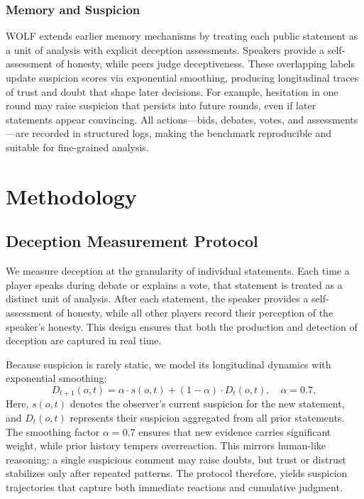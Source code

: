 \documentclass{article}
\begin{document}
\subsubsection*{Memory and Suspicion}
WOLF extends earlier memory mechanisms \cite{bailis2024werewolfarenacasestudy} by treating each public statement as a unit of analysis with explicit deception assessments. Speakers provide a self-assessment of honesty, while peers judge deceptiveness. These overlapping labels update suspicion scores via exponential smoothing, producing longitudinal traces of trust and doubt that shape later decisions. For example, hesitation in one round may raise suspicion that persists into future rounds, even if later statements appear convincing. All actions—bids, debates, votes, and assessments—are recorded in structured logs, making the benchmark reproducible and suitable for fine-grained analysis.  


\section{Methodology}
\label{sec:Method}
\subsection{Deception Measurement Protocol}
\label{subsec:deception-protocol}
We measure deception at the granularity of individual statements. Each time a player speaks during debate or explains a vote, that statement is treated as a distinct unit of analysis. After each statement, the speaker provides a self-assessment of honesty, while all other players record their perception of the speaker’s honesty. This design ensures that both the production and detection of deception are captured in real time.

Because suspicion is rarely static, we model its longitudinal dynamics with exponential smoothing:
\[
D_{t+1}(o,t) = \alpha \cdot s(o,t) + (1-\alpha)\cdot D_{t}(o,t), \quad \alpha=0.7,
\]
Here, $s(o,t)$ denotes the observer’s current suspicion for the new statement, and $D_t(o,t)$ represents their suspicion aggregated from all prior statements. The smoothing factor $\alpha = 0.7$ ensures that new evidence carries significant weight, while prior history tempers overreaction. This mirrors human-like reasoning: a single suspicious comment may raise doubts, but trust or distrust stabilizes only after repeated patterns. The protocol therefore, yields suspicion trajectories that capture both immediate reactions and cumulative judgment.
\end{document}
